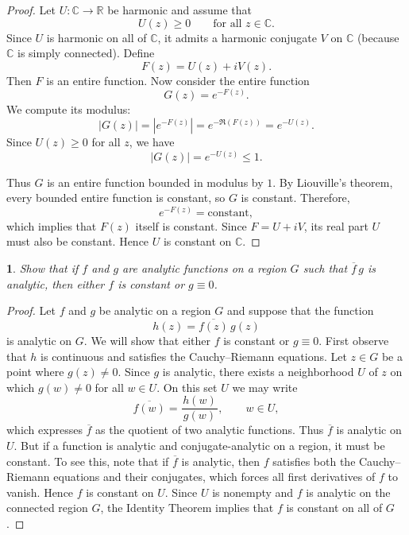 \documentclass[12pt, a4paper]{report}
\theoremstyle{spaced}
\newtheorem{exercise}{}
\newcommand{\setexercise}[1]{\setcounter{exercise}{#1-1}}
\begin{document}
\begin{proof}
	Let $U:\mathbb{C}\to\mathbb{R}$ be harmonic and assume that
	\[
		U(z)\ge 0 \qquad \text{for all } z\in\mathbb{C}.
	\]
	Since $U$ is harmonic on all of $\mathbb{C}$, it admits a harmonic conjugate $V$ on $\mathbb{C}$ (because $\mathbb{C}$ is simply connected).
	Define
	\[
		F(z)=U(z)+iV(z).
	\]
	Then $F$ is an entire function.
	Now consider the entire function
	\[
		G(z)=e^{-F(z)}.
	\]
	We compute its modulus:
	\[
		|G(z)| = |e^{-F(z)}|
		= e^{-\Re(F(z))}
		= e^{-U(z)}.
	\]
	Since $U(z)\ge 0$ for all $z$, we have
	\[
		|G(z)| = e^{-U(z)} \le 1.
	\]

	Thus \(G\) is an entire function bounded in modulus by \(1\).
	By Liouville’s theorem, every bounded entire function is constant, so \(G\) is constant. Therefore,
	\[
		e^{-F(z)} = \text{constant},
	\]
	which implies that \(F(z)\) itself is constant.
	Since \(F = U + iV\), its real part \(U\) must also be constant.
	Hence \(U\) is constant on \(\mathbb{C}\).
\end{proof}

\setexercise{10}
\begin{exercise}
	Show that if $f$ and $g$ are analytic functions on a region $G$ such that $\overline{f}\, g$ is analytic,
	then either $f$ is constant or $g \equiv 0$.
\end{exercise}

\begin{proof}
	Let $f$ and $g$ be analytic on a region $G$ and suppose that the function
	\[
		h(z)=\overline{f(z)}\, g(z)
	\]
	is analytic on $G$.
	We will show that either $f$ is constant or $g \equiv 0$.
	First observe that $h$ is continuous and satisfies the Cauchy--Riemann equations.
	Let $z\in G$ be a point where $g(z)\neq 0$.
	Since $g$ is analytic, there exists a neighborhood $U$ of $z$ on which $g(w)\neq 0$ for all $w\in U$.
	On this set $U$ we may write
	\[
		\overline{f(w)} = \frac{h(w)}{\,g(w)\,}, \qquad w\in U,
	\]
	which expresses $\overline{f}$ as the quotient of two analytic functions.
	Thus $\overline{f}$ is analytic on $U$.
	But if a function is analytic and conjugate-analytic on a region, it must be constant.
	To see this, note that if $\overline{f}$ is analytic, then $f$ satisfies both the Cauchy--Riemann equations and their conjugates, which forces all first derivatives of $f$ to vanish.
	Hence $f$ is constant on $U$.
	Since $U$ is nonempty and $f$ is analytic on the connected region $G$, the Identity Theorem implies that $f$ is constant on all of $G$.
\end{proof}
\end{document}

